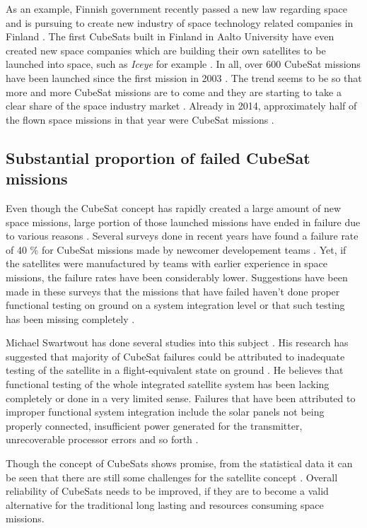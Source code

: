 \documentclass[english,12pt,a4paper,pdftex,elec,utf8]{aaltothesis}
\begin{document}
As an example, Finnish government recently passed a new law regarding space and is pursuing to create new industry of space technology related companies in Finland \cite{filaw}. The first CubeSats built in Finland in Aalto University have even created new space companies which are building their own satellites to be launched into space, such as \textit{Iceye} for example  \cite{iceye}. In all, over 600 CubeSat missions have been launched since the first mission in 2003 \cite{Swart2017kalvo}. The trend seems to be so that more and more CubeSat missions are to come and they are starting to take a clear share of the space industry market \cite{SpaceWorks2017}. Already in 2014, approximately half of the flown space missions in that year were CubeSat missions \cite{Swart2016}.\par 
\subsection{Substantial proportion of failed CubeSat missions}
Even though the CubeSat concept has rapidly created a large amount of new space missions, large portion of those launched missions have ended in failure due to various reasons \cite{Swart2016, Langer}. Several surveys done in recent years have found a failure rate of 40 \% for CubeSat missions made by newcomer developement teams \cite{Swart2016, Langer, Swart1, Swart2015}. Yet, if the satellites were manufactured by teams with earlier experience in space missions, the failure rates have been considerably lower. Suggestions have been made in these surveys that the missions that have failed haven't done proper functional testing on ground on a system integration level or that such testing has been missing completely \cite{Swart2016, Langer, Swart1}.\par
Michael Swartwout has done several studies into this subject \cite{Swart2017kalvo}. His research has suggested that majority of CubeSat failures could be attributed to inadequate testing of the satellite in a flight-equivalent state on ground \cite{Swart2016, Swart1, Swart2015}. He believes that functional testing of the whole integrated satellite system has been lacking completely or done in a very limited sense. Failures that have been attributed to improper functional system integration include the solar panels not being properly connected, insufficient power generated for the transmitter, unrecoverable processor errors and so forth \cite{Swart1}. \par
Though the concept of CubeSats shows promise, from the statistical data it can be seen that there are still some challenges for the satellite concept \cite{Swart2017kalvo, Swart2016, Langer, Swart1, Swart2015}. Overall reliability of CubeSats needs to be improved, if they are to become a valid alternative for the traditional long lasting and resources consuming space missions.\par 
\end{document}
